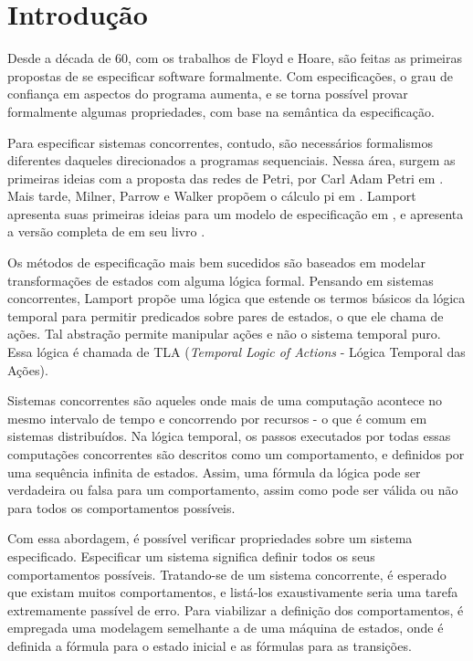 \chapter{Introdução}
\label{introducao}

Desde a década de 60, com os trabalhos de Floyd e Hoare, são feitas as primeiras
propostas de se especificar software formalmente. Com especificações, o grau de
confiança em aspectos do programa aumenta, e se torna possível provar formalmente algumas propriedades, com base na semântica da especificação.

Para especificar sistemas concorrentes, contudo, são necessários formalismos diferentes daqueles direcionados a programas sequenciais. Nessa área, surgem as primeiras ideias com a proposta das redes de Petri, por Carl Adam Petri em \cite{petri}. Mais tarde, Milner, Parrow e Walker propõem o cálculo pi em \cite{picalculus}. Lamport apresenta suas primeiras ideias para um modelo de especificação em \cite{first-lamport}, e apresenta a versão completa de \TLA em seu livro \cite{specifying-systems}.

Os métodos de especificação mais bem sucedidos são baseados em modelar transformações de estados com alguma lógica formal. Pensando em sistemas concorrentes, Lamport propõe uma lógica que estende os termos básicos da lógica temporal para permitir predicados sobre pares de estados, o que ele chama de ações. Tal abstração permite manipular ações e não o sistema temporal puro. Essa lógica é chamada de TLA (\textit{Temporal Logic of Actions} - Lógica Temporal das Ações).

Sistemas concorrentes são aqueles onde mais de uma computação acontece no mesmo intervalo de tempo e concorrendo por recursos - o que é comum em sistemas distribuídos. Na lógica temporal, os passos executados por todas essas computações concorrentes são descritos como um comportamento, e definidos por uma sequência infinita de estados. Assim, uma fórmula da lógica pode ser verdadeira ou falsa para um comportamento, assim como pode ser válida ou não para todos os comportamentos possíveis.

Com essa abordagem, é possível verificar propriedades sobre um sistema especificado. Especificar um sistema significa definir todos os seus comportamentos possíveis. Tratando-se de um sistema concorrente, é esperado que existam muitos comportamentos, e listá-los exaustivamente seria uma tarefa extremamente passível de erro. Para viabilizar a definição dos comportamentos, é empregada uma modelagem semelhante a de uma máquina de estados, onde é definida a fórmula para o estado inicial e as fórmulas para as transições.

